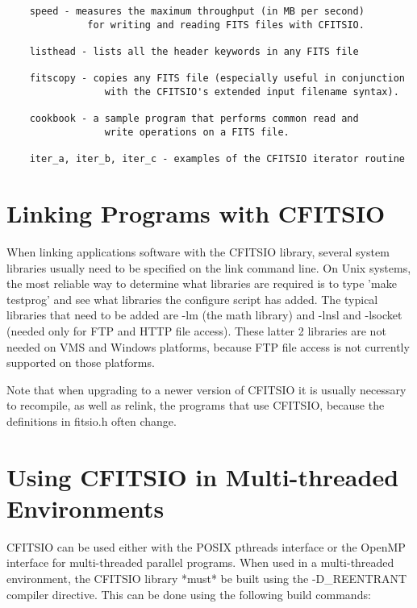 \documentclass[11pt]{book}
\begin{document}
\begin{verbatim}
    speed - measures the maximum throughput (in MB per second)
              for writing and reading FITS files with CFITSIO.

    listhead - lists all the header keywords in any FITS file

    fitscopy - copies any FITS file (especially useful in conjunction
                 with the CFITSIO's extended input filename syntax).

    cookbook - a sample program that performs common read and
                 write operations on a FITS file.

    iter_a, iter_b, iter_c - examples of the CFITSIO iterator routine
\end{verbatim}


\section{Linking Programs with CFITSIO}

When linking applications software with the CFITSIO library, several
system libraries usually need to be specified on the link command
line.  On Unix systems, the most reliable way to determine what
libraries are required is to type 'make testprog' and see what
libraries the configure script has added.  The typical libraries that
need to be added are -lm (the math library) and -lnsl and -lsocket
(needed only for FTP and HTTP file access).  These latter 2 libraries
are not needed on VMS and Windows platforms, because FTP file access is
not currently supported on those platforms.

Note that when upgrading to a newer version of CFITSIO it is usually
necessary to recompile, as well as relink, the programs that use CFITSIO,
because the definitions in fitsio.h often change.


\section{Using CFITSIO in Multi-threaded Environments}

CFITSIO can be used either with the
POSIX pthreads interface or the OpenMP interface for multi-threaded
parallel programs.  When used in a multi-threaded environment,
the CFITSIO library *must* be built using
the -D\_REENTRANT compiler directive.  This can be done using the following
build commands:
\end{document}
